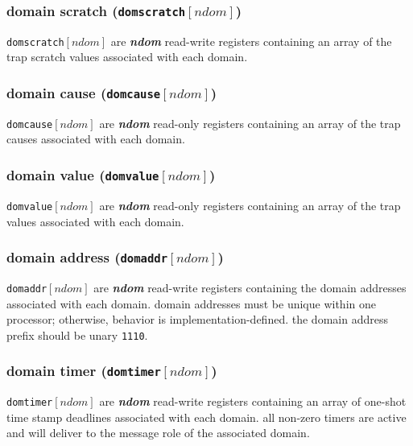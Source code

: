\subsubsection{domain scratch (\texttt{domscratch}$[\mathit{ndom}]$)}
\texttt{domscratch}$[\mathit{ndom}]$ are \textbf{\emph{ndom}} read-write
registers containing an array of the trap scratch values associated with
each domain.
\\

\subsubsection{domain cause (\texttt{domcause}$[\mathit{ndom}]$)}
\texttt{domcause}$[\mathit{ndom}]$ are \textbf{\emph{ndom}} read-only
registers containing an array of the trap causes associated with each
domain.
\\

\subsubsection{domain value (\texttt{domvalue}$[\mathit{ndom}]$)}
\texttt{domvalue}$[\mathit{ndom}]$ are \textbf{\emph{ndom}} read-only
registers containing an array of the trap values associated with each
domain.
\\

\subsubsection{domain address (\texttt{domaddr}$[\mathit{ndom}]$)}
\texttt{domaddr}$[\mathit{ndom}]$ are \textbf{\emph{ndom}} read-write
registers containing the domain addresses associated with each domain.
domain addresses must be unique within one processor;
otherwise, behavior is implementation-defined.
the domain address prefix should be unary \texttt{1110}.
\\

\subsubsection{domain timer (\texttt{domtimer}$[\mathit{ndom}]$)}
\texttt{domtimer}$[\mathit{ndom}]$ are \textbf{\emph{ndom}} read-write
registers containing an array of one-shot time stamp deadlines associated
with each domain. all non-zero timers are active and will deliver to the
message role of the associated domain.
\\

